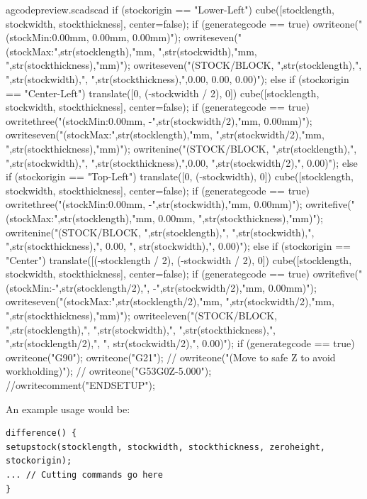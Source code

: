 \documentclass{ltxdoc}
\begin{document}
\begin{writecode}{a}{gcodepreview.scad}{scad}
{{    if (stockorigin == "Lower-Left") {
    cube([stocklength, stockwidth, stockthickness], center=false);
if (generategcode == true) {
owriteone("(stockMin:0.00mm, 0.00mm, 0.00mm)");
owriteseven("(stockMax:",str(stocklength),"mm, ",str(stockwidth),"mm, ",str(stockthickness),"mm)");
owriteseven("(STOCK/BLOCK, ",str(stocklength),", ",str(stockwidth),", ",str(stockthickness),",0.00, 0.00, 0.00)");
    }
}    else if (stockorigin == "Center-Left") {
    translate([0, (-stockwidth / 2), 0]){
      cube([stocklength, stockwidth, stockthickness], center=false);
if (generategcode == true) {
owritethree("(stockMin:0.00mm, -",str(stockwidth/2),"mm, 0.00mm)");
owriteseven("(stockMax:",str(stocklength),"mm, ",str(stockwidth/2),"mm, ",str(stockthickness),"mm)");
owritenine("(STOCK/BLOCK, ",str(stocklength),", ",str(stockwidth),", ",str(stockthickness),",0.00, ",str(stockwidth/2),", 0.00)");
    }
  } 
    } else if (stockorigin == "Top-Left") {
    translate([0, (-stockwidth), 0]){
      cube([stocklength, stockwidth, stockthickness], center=false);
    }
if (generategcode == true) {
owritethree("(stockMin:0.00mm, -",str(stockwidth),"mm, 0.00mm)");
owritefive("(stockMax:",str(stocklength),"mm, 0.00mm, ",str(stockthickness),"mm)");
owritenine("(STOCK/BLOCK, ",str(stocklength),", ",str(stockwidth),", ",str(stockthickness),", 0.00, ", str(stockwidth),", 0.00)");
  }
}    else if (stockorigin == "Center") {
    translate([(-stocklength / 2), (-stockwidth / 2), 0]){
      cube([stocklength, stockwidth, stockthickness], center=false);
    }
if (generategcode == true) {
owritefive("(stockMin:-",str(stocklength/2),", -",str(stockwidth/2),"mm, 0.00mm)");
owriteseven("(stockMax:",str(stocklength/2),"mm, ",str(stockwidth/2),"mm, ",str(stockthickness),"mm)");
owriteeleven("(STOCK/BLOCK, ",str(stocklength),", ",str(stockwidth),", ",str(stockthickness),", ",str(stocklength/2),", ", str(stockwidth/2),", 0.00)");
    }
  }
}
if (generategcode == true) {
    owriteone("G90");
    owriteone("G21");
//    owriteone("(Move to safe Z to avoid workholding)");
//    owriteone("G53G0Z-5.000");
  }
//owritecomment("ENDSETUP");
}

\end{writecode}
\addtocounter{gcpscad}{93}

An example usage would be:

\begin{verbatim}
difference() {
setupstock(stocklength, stockwidth, stockthickness, zeroheight, stockorigin);
... // Cutting commands go here
}
\end{verbatim}
\end{document}

